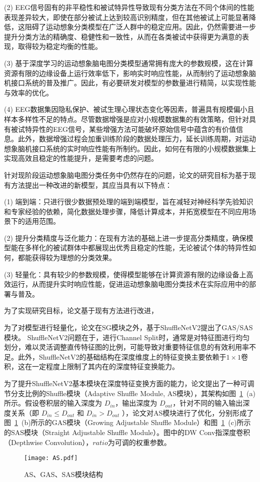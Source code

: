 (2) EEG信号固有的非平稳性和被试特异性导致现有分类方法在不同个体间的性能表现差异较大，即使在部分被试上达到较高识别精度，但在其他被试上可能显著降低，这阻碍了运动想象分类模型在广泛人群中的稳定应用。因此，仍然需要进一步提升分类方法的精确度、稳健性和一致性，从而在各类被试中获得更为满意的表现，取得较为稳定均衡的性能。

(3) 基于深度学习的运动想象脑电图分类模型通常拥有庞大的参数规模，这在计算资源有限的边缘设备上运行效率低下，影响实时响应性能，从而制约了运动想象脑机接口系统的普及推广。因此，有必要研发对模型的参数量进行精简，以实现性能与效率的优化。

(4) EEG数据集因隐私保护、被试生理心理状态变化等因素，普遍具有规模偏小且样本多样性不足的特点。尽管数据增强是应对小规模数据集的有效策略，但针对具有被试特异性的EEG信号，某些增强方法可能破坏原始信号中蕴含的有价值信息。此外，数据增强过程会加重训练阶段的数据处理压力，延长训练周期，对运动想象脑机接口系统的实时响应性能有所制约。因此，如何在有限的小规模数据集上实现高效且稳定的性能提升，是需要考虑的问题。




针对现阶段运动想象脑电图分类任务中仍然存在的问题，论文的研究目标为基于现有方法提出一种改进的新模型，其应当具有以下特点：

(1) 端到端：只进行很少数据预处理的端到端模型，旨在减轻对神经科学先验知识和专家经验的依赖，简化数据处理步骤，降低计算成本，并拓宽模型在不同应用场景下的适用范围。

(2) 提升分类精度与泛化能力：在现有方法的基础上进一步提高分类精度，确保模型能在多样化的被试群体中都展现出优秀且稳定的性能，无论被试个体的特异性如何，都能获得较为理想的分类效果。

(3) 轻量化：具有较少的参数规模，使得模型能够在计算资源有限的边缘设备上高效运行，从而提升实时响应性能，促进运动想象脑电图分类技术在实际应用中的部署与普及。

为了实现研究目标，论文基于现有方法进行改进，




为了对模型进行轻量化，论文在SG模块之外，基于ShuffleNetV2提出了GAS/SAS模块。
ShuffleNetV2问题在于，进行Channel Split时，通常是对特征图进行均匀划分，难以灵活调整直传特征图的比例，可能导致对重要特征信息的有效利用率不足。此外，ShuffleNetV2的基础结构在深度维度上的特征变换主要依赖于\(1\times1\)卷积，这在一定程度上限制了其内在的深度特征变换能力。

为了提升ShuffleNetV2基本模块在深度特征变换方面的能力，论文提出了一种可调节分支比例的Shuffle模块（Adaptive Shuffle Module, AS模块），其架构如图~\ref{fig:as}~(a)所示。假设卷积层的输入深度为 \(D_{in}\)，输出深度为 \(D_{out}\)，针对不同的输入输出深度关系（即 \(D_{in} \le D_{out}\) 和 \(D_{in} > D_{out}\) ），论文对AS模块进行了优化，分别形成了图~\ref{fig:as}~(b)所示的GAS模块（Growing Adjustable Shuffle Module）和图~\ref{fig:as}~(c)所示的SAS模块（Straight Adjustable Shuffle Module）。图中的DW Conv指深度卷积（Depthwise Convolution），\(ratio\)为可调的权重参数。
\begin{figure}
    \centering
    \texttt{[image: AS.pdf]}
    \caption{AS、GAS、SAS模块结构}
    \label{fig:as}
\end{figure}

